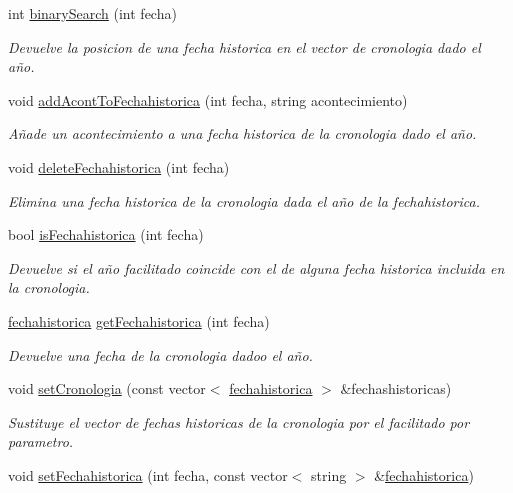 \begin{DoxyCompactItemize}
int \hyperlink{classcronologia_a0823548132f504157eb7695cda59132f}{binary\+Search} (int fecha)
\begin{DoxyCompactList}\small\item\em Devuelve la posicion de una fecha historica en el vector de cronologia dado el año. \end{DoxyCompactList}\item 
void \hyperlink{classcronologia_a021c701e3df41a2bb60e26e1cd11a470}{add\+Acont\+To\+Fechahistorica} (int fecha, string acontecimiento)
\begin{DoxyCompactList}\small\item\em Añade un acontecimiento a una fecha historica de la cronologia dado el año. \end{DoxyCompactList}\item 
void \hyperlink{classcronologia_ae63e1056d7968301d61e5e5b8afd1773}{delete\+Fechahistorica} (int fecha)
\begin{DoxyCompactList}\small\item\em Elimina una fecha historica de la cronologia dada el año de la fechahistorica. \end{DoxyCompactList}\item 
bool \hyperlink{classcronologia_a843726fccc17be8f3da54d49afc1694f}{is\+Fechahistorica} (int fecha)
\begin{DoxyCompactList}\small\item\em Devuelve si el año facilitado coincide con el de alguna fecha historica incluida en la cronologia. \end{DoxyCompactList}\item 
\hyperlink{classfechahistorica}{fechahistorica} \hyperlink{classcronologia_af3c0e9ee4790a8776126281f389208de}{get\+Fechahistorica} (int fecha)
\begin{DoxyCompactList}\small\item\em Devuelve una fecha de la cronologia dadoo el año. \end{DoxyCompactList}\item 
void \hyperlink{classcronologia_ad05c24675b6083459823ed194cf79b69}{set\+Cronologia} (const vector$<$ \hyperlink{classfechahistorica}{fechahistorica} $>$ \&fechashistoricas)
\begin{DoxyCompactList}\small\item\em Sustituye el vector de fechas historicas de la cronologia por el facilitado por parametro. \end{DoxyCompactList}\item 
void \hyperlink{classcronologia_a428eaf606516d28ae8a68bbb6656c2c0}{set\+Fechahistorica} (int fecha, const vector$<$ string $>$ \&\hyperlink{classfechahistorica}{fechahistorica})

\end{DoxyCompactItemize}

